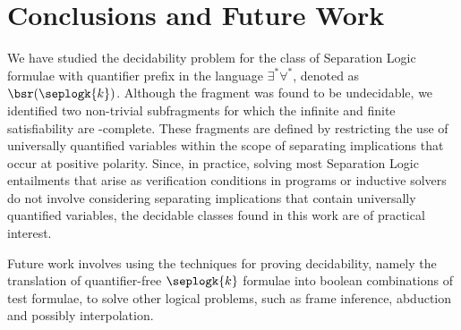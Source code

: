 \section{Conclusions and Future Work}

We have studied the decidability problem for the class of Separation
Logic formulae with quantifier prefix in the language
$\exists^*\forall^*$, denoted as $\bsr(\seplogk{k})$. Although the
fragment was found to be undecidable, we identified two non-trivial
subfragments for which the infinite and finite satisfiability
are \pspace-complete. These fragments are defined by restricting the
use of universally quantified variables within the scope of separating
implications that occur at positive polarity. Since, in practice,
solving most Separation Logic entailments that arise as verification
conditions in programs or inductive solvers do not involve considering
separating implications that contain universally quantified variables,
the decidable classes found in this work are of practical interest.

Future work involves using the techniques for proving decidability,
namely the translation of quantifier-free $\seplogk{k}$ formulae into
boolean combinations of test formulae, to solve other logical
problems, such as frame inference, abduction and possibly
interpolation. 
